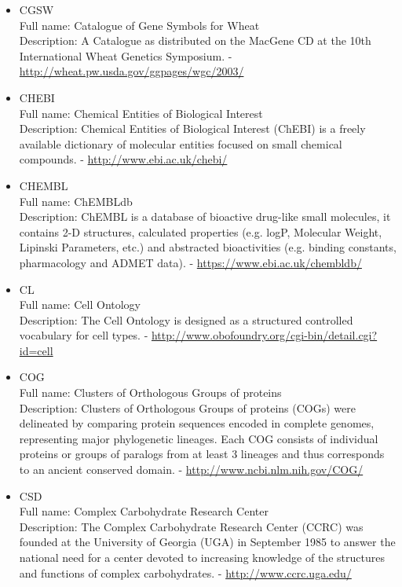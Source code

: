\begin{itemize}
\item{CGSW}\\ Full name: Catalogue of Gene Symbols for Wheat\\ Description: A Catalogue as distributed on the MacGene CD at the 10th International Wheat Genetics Symposium. - 
\url{http://wheat.pw.usda.gov/ggpages/wgc/2003/}

\item{CHEBI}\\ Full name: Chemical Entities of Biological Interest\\ Description: Chemical Entities of Biological Interest (ChEBI) is a freely available dictionary of molecular entities focused on small chemical compounds. - 
\url{http://www.ebi.ac.uk/chebi/}

\item{CHEMBL}\\ Full name: ChEMBLdb\\ Description: ChEMBL is a database of bioactive drug-like small molecules, it contains 2-D structures, calculated properties (e.g. logP, Molecular Weight, Lipinski Parameters, etc.) and abstracted bioactivities (e.g. binding constants, pharmacology and ADMET data). - 
\url{https://www.ebi.ac.uk/chembldb/}

\item{CL}\\ Full name: Cell Ontology\\ Description: The Cell Ontology is designed as a structured controlled vocabulary for cell types. - 
\url{http://www.obofoundry.org/cgi-bin/detail.cgi?id=cell}

\item{COG}\\ Full name: Clusters of Orthologous Groups of proteins\\ Description: Clusters of Orthologous Groups of proteins (COGs) were delineated by comparing protein sequences encoded in complete genomes, representing major phylogenetic lineages. Each COG consists of individual proteins or groups of paralogs from at least 3 lineages and thus corresponds to an ancient conserved domain. - 
\url{http://www.ncbi.nlm.nih.gov/COG/}

\item{CSD}\\ Full name: Complex Carbohydrate Research Center\\ Description: The Complex Carbohydrate Research Center (CCRC) was founded at the University of Georgia (UGA) in September 1985 to answer the national need for a center devoted to increasing knowledge of the structures and functions of complex carbohydrates. - 
\url{http://www.ccrc.uga.edu/}


\end{itemize}

